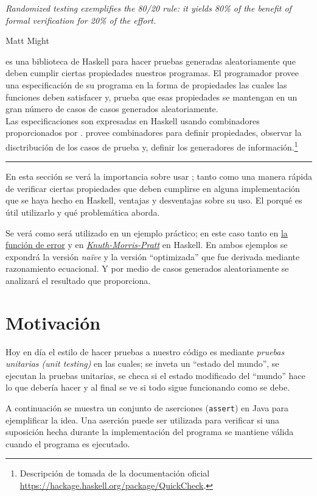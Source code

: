 \epigraph{\itshape Randomized testing exemplifies the 80/20 rule: it yields 80\% of the benefit
of formal verification for 20\% of the effort.}{Matt Might}

\QuickCheck es una biblioteca de Haskell para hacer pruebas generadas aleatoriamente que deben
cumplir ciertas propiedades nuestros programas. El programador provee una especificación de su
programa en la forma de propiedades las cuales las funciones deben satisfacer y, \QuickCheck prueba
que esas propiedades se mantengan en un gran número de casos de casos generados aleatoriamente.\\
Las especificaciones son expresadas en Haskell usando combinadores proporcionados por \QuickCheck.
\QuickCheck provee combinadores para definir propiedades, observar la disctribución de los casos
de prueba y, definir los generadores de información.\footnote{
    Descripción de \QuickCheck tomada de la documentación oficial\\
    \url{https://hackage.haskell.org/package/QuickCheck}.
}

\noindent\rule{\textwidth}{1pt}
\hfill \break

En esta sección se verá la importancia sobre usar \QuickCheck; tanto como una manera rápida de
verificar ciertas propiedades que deben cumplirse en alguna implementación que se haya hecho en
Haskell, ventajas y desventajas sobre su uso. El porqué es útil utilizarlo y qué problemática
aborda.

Se verá como será utilizado en un ejemplo práctico; en este caso tanto en
\hyperlink{funcional:funcion_error}{la función de error} y en
\hyperlink{funcional:kmp}{\textit{Knuth-Morris-Pratt}} en Haskell. En ambos ejemplos se expondrá la
versión \textit{naïve} y la versión ``optimizada'' que fue derivada mediante razonamiento
ecuacional. Y por medio de casos generados aleatoriamente se analizará el resultado que
\QuickCheck proporciona.

\section{Motivación}
Hoy en día el estilo de hacer pruebas a nuestro código es mediante \textit{pruebas unitarias (unit
testing)} en las cuales; se inveta un ``estado del mundo'', se ejecutan la pruebas unitarias, se
checa si el estado modificado del ``mundo'' hace lo que debería hacer y al final se ve si todo
sigue funcionando como se debe.

A continuación se muestra un conjunto de aserciones (\texttt{assert}) en Java para ejemplificar
la idea. Una aserción puede ser utilizada para verificar si una suposición hecha durante la
implementación del programa se mantiene válida cuando el programa es ejecutado.

